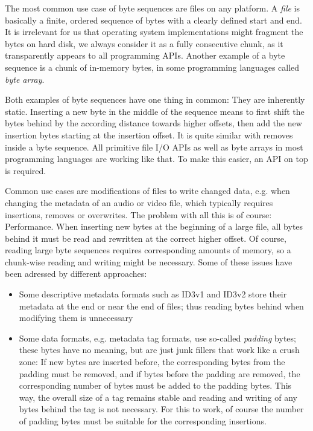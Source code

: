 \documentclass[english, 10pt, openright, twocolumn, landscape, twoside, notitlepage, a4paper, pdftex]		
{article}
\begin{document}
The most common use case of byte sequences are files on any platform. A \emph{file} is basically a finite, ordered sequence of bytes with a clearly defined start and end. It is irrelevant for us that operating system implementations might fragment the bytes on hard disk, we always consider it as a fully consecutive chunk, as it transparently appears to all programming APIs. Another example of a byte sequence is a chunk of in-memory bytes, in some programming languages called \emph{byte array}.

Both examples of byte sequences have one thing in common: They are inherently static. Inserting a new byte in the middle of the sequence means to first shift the bytes behind by the according distance towards higher offsets, then add the new insertion bytes starting at the insertion offset. It is quite similar with removes inside a byte sequence. All primitive file I/O APIs as well as byte arrays in most programming languages are working like that. To make this easier, an API on top is required.

Common use cases are modifications of files to write changed data, e.g. when changing the metadata of an audio or video file, which typically requires insertions, removes or overwrites. The problem with all this is of course: Performance. When inserting new bytes at the beginning of a large file, all bytes behind it must be read and rewritten at the correct higher offset. Of course, reading large byte sequences requires corresponding amounts of memory, so a chunk-wise reading and writing might be necessary. Some of these issues have been adressed by different approaches:
\begin{itemize}
\item Some descriptive metadata formats such as ID3v1 and ID3v2 store their metadata at the end or near the end of files; thus reading bytes behind when modifying them is unnecessary
\item Some data formats, e.g. metadata tag formats, use so-called \emph{padding} bytes; these bytes have no meaning, but are just junk fillers that work like a crush zone: If new bytes are inserted before, the corresponding bytes from the padding must be removed, and if bytes before the padding are removed, the corresponding number of bytes must be added to the padding bytes. This way, the overall size of a tag remains stable and reading and writing of any bytes behind the tag is not necessary. For this to work, of course the number of padding bytes must be suitable for the corresponding insertions.
\end{itemize}
\end{document}
